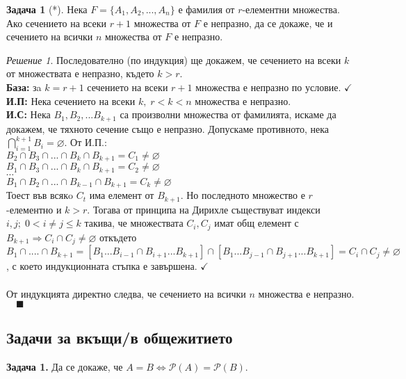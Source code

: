 \documentclass[10pt, a4paper]{article}
\theoremstyle{definition}
\newtheorem{problem}{Задача}
\theoremstyle{remark}
\newtheorem*{sol}{Решение}
\begin{document}
\begin{problem}[*]
    Нека $F=\{A_1,A_2,...,A_n\}$ е фамилия от $r$-елементни множества. Ако сечението на всеки $r+1$ множества от $F$ е непразно, да се докаже, че и сечението на всички $n$ множества от $F$ е непразно.
\end{problem}
\begin{sol}
    Последователно (по индукция) ще докажем, че сечението на всеки $k$ от множествата е непразно, където $k>r$.\\
    \textbf{База:} зa $k=r+1$ сечението на всеки $r+1$ множества е непразно по условие. \(\checkmark\)\\
    \textbf{И.П:} Нека сечението на всеки $k,\;r<k<n$ множества е непразно.\\
    \textbf{И.С:} Нека $B_1, B_2, ... B_{k+1}$ са произволни множества от фамилията, искаме да докажем, че тяхното сечение също е непразно. Допускаме противното, нека $\bigcap_{i=1}^{k+1}B_i=\varnothing$. От И.П.:\\
    $B_2\cap B_3\cap...\cap B_{k}\cap B_{k+1}=C_1\neq\varnothing$\\
    $B_1\cap B_3\cap...\cap B_{k}\cap B_{k+1}=C_2\neq\varnothing$\\
    $\cdots$\\
    $B_1\cap B_2\cap...\cap B_{k-1}\cap B_{k+1}=C_k\neq\varnothing$\\
    Тоест във всякo $C_t$ има елемент от $B_{k+1}$. Но последното множество е $r$-елементно и $k>r$. Тогава от принципа на Дирихле съществуват индекси $i,j;\;0<i\neq j\leq k$ такива, че множествата \(C_i, C_j\) имат общ елемент с $B_{k+1} \Rightarrow C_i\cap C_j\neq\varnothing$ откъдето $B_1\cap....\cap B_{k+1}=[B_1... B_{i-1}\cap B_{i+1}... B_{k+1}]\cap[B_1... B_{j-1}\cap B_{j+1} ...  B_{k+1}]=C_i\cap C_j\neq\varnothing$, с което индукционната стъпка е завършена. \(\checkmark\)\\
    \\От индукцията директно следва, че сечението на всички \(n\) множества е непразно.$\quad\blacksquare$
\end{sol}

\hfill
\subsection*{Задачи за вкъщи/в общежитието}
\begin{flushleft}
    \textbf{Задача 1.} Да се докаже, че $A=B \Leftrightarrow \mathcal{P}(A)=\mathcal{P}(B)$.\\
\end{flushleft}
\end{document}

